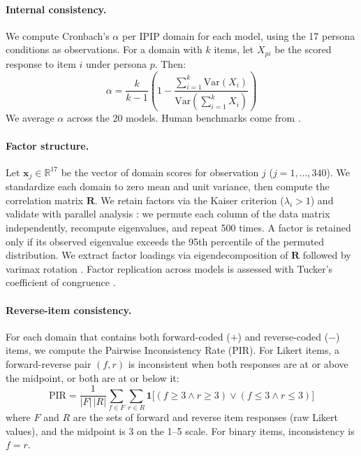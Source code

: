 \documentclass[11pt]{article}
\begin{document}
\paragraph{Internal consistency.}
We compute Cronbach's $\alpha$ per IPIP domain for each model, using the 17 persona conditions as observations. For a domain with $k$ items, let $X_{pi}$ be the scored response to item $i$ under persona $p$. Then:
\begin{equation}
\alpha = \frac{k}{k-1}\left(1 - \frac{\sum_{i=1}^{k} \mathrm{Var}(X_i)}{\mathrm{Var}\!\left(\sum_{i=1}^{k} X_i\right)}\right)
\label{eq:cronbach}
\end{equation}
We average $\alpha$ across the 20 models. Human benchmarks come from \citet{johnson2014measuring}.

\paragraph{Factor structure.}
Let $\mathbf{x}_j \in \mathbb{R}^{17}$ be the vector of domain scores for observation $j$ ($j = 1, \ldots, 340$). We standardize each domain to zero mean and unit variance, then compute the correlation matrix $\mathbf{R}$. We retain factors via the Kaiser criterion ($\lambda_i > 1$) \citep{kaiser1960application} and validate with parallel analysis \citep{horn1965parallel}: we permute each column of the data matrix independently, recompute eigenvalues, and repeat 500 times. A factor is retained only if its observed eigenvalue exceeds the 95th percentile of the permuted distribution. We extract factor loadings via eigendecomposition of $\mathbf{R}$ followed by varimax rotation \citep{kaiser1958varimax}. Factor replication across models is assessed with Tucker's coefficient of congruence \citep{tucker1951method}.

\paragraph{Reverse-item consistency.}
For each domain that contains both forward-coded ($+$) and reverse-coded ($-$) items, we compute the Pairwise Inconsistency Rate (PIR). For Likert items, a forward-reverse pair $(f, r)$ is inconsistent when both responses are at or above the midpoint, or both are at or below it:
{\small
\begin{equation}
\mathrm{PIR} = \frac{1}{|F|\,|R|} \sum_{f \in F}\sum_{r \in R} \mathbf{1}\!\bigl[(f \ge 3 \wedge r \ge 3) \vee (f \le 3 \wedge r \le 3)\bigr]
\label{eq:pir}
\end{equation}
}
where $F$ and $R$ are the sets of forward and reverse item responses (raw Likert values), and the midpoint is 3 on the 1--5 scale. For binary items, inconsistency is $f = r$.
\end{document}
